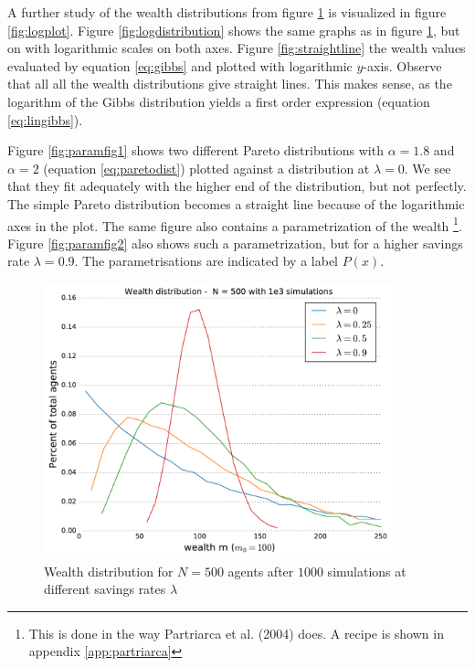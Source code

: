 \documentclass[10pt, a4paper]{amsart}
\begin{document}
A further study of the wealth distributions from figure \ref{fig:distribution} is visualized in figure \ref{fig:logplot}. Figure  \ref{fig:logdistribution} shows the same graphs as in figure \ref{fig:distribution}, but on with logarithmic scales on both axes. Figure \ref{fig:straightline} the wealth values evaluated by equation \ref{eq:gibbs} and plotted with logarithmic $y$-axis. Observe that all all the wealth distributions give straight lines. This makes sense, as the logarithm of the Gibbs distribution yields a first order expression (equation \ref{eq:lingibbs}).

Figure \ref{fig:paramfig1} shows two different Pareto distributions with $\alpha=1.8$ and $\alpha = 2$ (equation \ref{eq:paretodist}) plotted against a distribution at $\lambda = 0$. We see that they fit adequately with the higher end of the distribution, but not perfectly. The simple Pareto distribution becomes a straight line because of the logarithmic axes in the plot. The same figure also contains a parametrization of the wealth \footnote{This is done in the way Partriarca et al. (2004)\cite{Patriarca} does. A recipe is shown in appendix \ref{app:partriarca}}. Figure \ref{fig:paramfig2} also shows such a parametrization, but for a higher savings rate $\lambda=0.9$. The parametrisations are indicated by a label $P(x)$.


\begin{figure}
	\centering
	\includegraphics[width=0.9\textwidth]{../figures/5ac/5c_N500_varSavings.pdf}
	\caption{Wealth distribution for $N=500$ agents after $1000$ simulations at different savings rates $\lambda$}
	\label{fig:distribution}
\end{figure}
\end{document}

